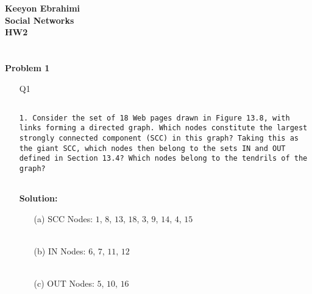 \documentclass[ruled]{article}
\begin{document}
\textbf{Keeyon Ebrahimi}\\
\textbf{Social Networks}\\
\textbf{HW2}\\ \\ \\
\textbf{Problem 1}

\begin{itemize}
\item[Q1] 
\begin{verbatim}

1. Consider the set of 18 Web pages drawn in Figure 13.8, with
links forming a directed graph. Which nodes constitute the largest
strongly connected component (SCC) in this graph? Taking this as
the giant SCC, which nodes then belong to the sets IN and OUT
defined in Section 13.4? Which nodes belong to the tendrils of the
graph?


\end{verbatim}
\textbf{Solution: }\\
\begin{itemize}
\item[(a)] SCC Nodes:  {\Large $1$, $8$, $13$, $18$, $3$, $9$, $14$, $4$, $15$} \\ \\

\item[(b)]  IN Nodes:  {\Large $6$, $7$, $11$, $12$ } \\ \\

\item[(c)]  OUT Nodes:  {\Large $5$, $10$, $16$}
\\
\\
\end{itemize}
\end{itemize}
\end{document}
